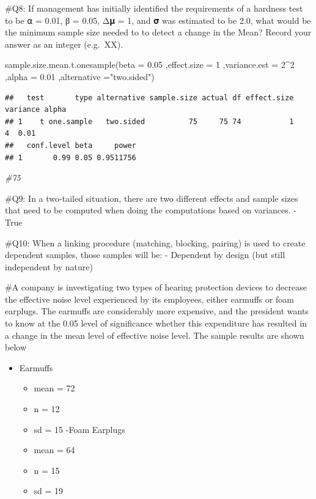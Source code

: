 \documentclass[
]{article}
\newenvironment{Shaded}{\begin{snugshade}}{\end{snugshade}}
\newcommand{\AttributeTok}[1]{\textcolor[rgb]{0.77,0.63,0.00}{#1}}
\newcommand{\CommentTok}[1]{\textcolor[rgb]{0.56,0.35,0.01}{\textit{#1}}}
\newcommand{\DecValTok}[1]{\textcolor[rgb]{0.00,0.00,0.81}{#1}}
\newcommand{\FloatTok}[1]{\textcolor[rgb]{0.00,0.00,0.81}{#1}}
\newcommand{\FunctionTok}[1]{\textcolor[rgb]{0.00,0.00,0.00}{#1}}
\newcommand{\NormalTok}[1]{#1}
\newcommand{\SpecialCharTok}[1]{\textcolor[rgb]{0.00,0.00,0.00}{#1}}
\newcommand{\StringTok}[1]{\textcolor[rgb]{0.31,0.60,0.02}{#1}}
\providecommand{\tightlist}{%
  \setlength{\itemsep}{0pt}\setlength{\parskip}{0pt}}
\begin{document}
\#Q8: If management has initially identified the requirements of a
hardness test to be ⍺ = 0.01, β = 0.05, Δ𝛍 = 1, and 𝛔 was estimated to
be 2.0, what would be the minimum sample size needed to to detect a
change in the Mean? Record your answer as an integer (e.g.~XX).

\begin{Shaded}
\begin{Highlighting}[]
\FunctionTok{sample.size.mean.t.onesample}\NormalTok{(}\AttributeTok{beta =} \FloatTok{0.05}
\NormalTok{                       ,}\AttributeTok{effect.size =} \DecValTok{1}
\NormalTok{                       ,}\AttributeTok{variance.est =} \DecValTok{2}\SpecialCharTok{\^{}}\DecValTok{2}
\NormalTok{                       ,}\AttributeTok{alpha =} \FloatTok{0.01}
\NormalTok{                       ,}\AttributeTok{alternative =}\StringTok{"two.sided"}\NormalTok{)}
\end{Highlighting}
\end{Shaded}

\begin{verbatim}
##   test       type alternative sample.size actual df effect.size variance alpha
## 1    t one.sample   two.sided          75     75 74           1        4  0.01
##   conf.level beta     power
## 1       0.99 0.05 0.9511756
\end{verbatim}

\begin{Shaded}
\begin{Highlighting}[]
\CommentTok{\#75}
\end{Highlighting}
\end{Shaded}

\#Q9: In a two-tailed situation, there are two different effects and
sample sizes that need to be computed when doing the computations based
on variances. - True

\#Q10: When a linking procedure (matching, blocking, pairing) is used to
create dependent samples, those samples will be: - Dependent by design
(but still independent by nature)

\#A company is investigating two types of hearing protection devices to
decrease the effective noise level experienced by its employees, either
earmuffs or foam earplugs. The earmuffs are considerably more expensive,
and the president wants to know at the 0.05 level of significance
whether this expenditure has resulted in a change in the mean level of
effective noise level. The sample results are shown below

\begin{itemize}
\tightlist
\item
  Earmuffs

  \begin{itemize}
  \tightlist
  \item
    mean = 72
  \item
    n = 12
  \item
    sd = 15 -Foam Earplugs
  \item
    mean = 64
  \item
    n = 15
  \item
    sd = 19
  \end{itemize}
\end{itemize}
\end{document}
